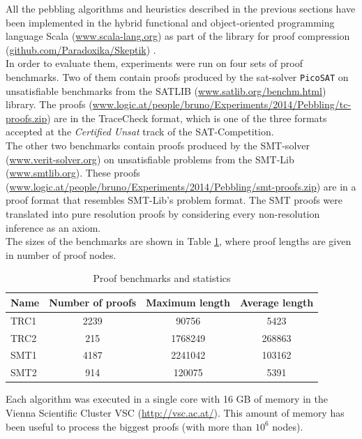 \documentclass{llncs}
\begin{document}
All the pebbling algorithms and heuristics described in the previous sections have been implemented in the hybrid functional and object-oriented programming
language Scala (\url{www.scala-lang.org}) as part of the \skeptik library for proof compression (\url{github.com/Paradoxika/Skeptik}) \cite{Skeptik}.\\
In order to evaluate them, experiments were run on four sets of proof benchmarks. Two of them contain proofs produced by the sat-solver \texttt{PicoSAT} \cite{Biere_picosatessentials} on unsatisfiable benchmarks from the SATLIB (\url{www.satlib.org/benchm.html}) library. The proofs (\url{www.logic.at/people/bruno/Experiments/2014/Pebbling/tc-proofs.zip}) are in the TraceCheck format, which is one of the three formats accepted at the \emph{Certified Unsat} track of the SAT-Competition.\\
The other two benchmarks contain proofs produced by the SMT-solver {\veriT} (\url{www.verit-solver.org}) 
on unsatisfiable problems from the SMT-Lib (\url{www.smtlib.org}). These proofs (\url{www.logic.at/people/bruno/Experiments/2014/Pebbling/smt-proofs.zip}) are in a proof format that resembles SMT-Lib's problem format.
The SMT proofs were translated into pure resolution proofs by considering every non-resolution inference as an axiom.\\
%
The sizes of the benchmarks are shown in Table \ref{tab:benchmarks}, where proof lengths are given in number of proof nodes.

\begin{table}[tb]
	\centering
	\begin{tabular}{l|c|c|c}
		\textbf{Name} & \textbf{Number of proofs} & \textbf{Maximum length} & \textbf{Average length} \\ \toprule
		TRC1 & 2239 & 90756   & 5423   \\ \hline
		TRC2 & 215	& 1768249 & 268863 \\ \hline
    SMT1 & 4187 & 2241042 & 103162 \\ \hline
    SMT2 & 914  & 120075  & 5391  \\     
	\end{tabular}
	\caption{Proof benchmarks and statistics}
	\label{tab:benchmarks}
\end{table}

Each algorithm was executed in a single core with 16 GB of memory 
in the Vienna Scientific Cluster VSC 
(\url{http://vsc.ac.at/}). This amount of memory has been useful to process the biggest proofs (with more than $10^6$ nodes).
\end{document}
